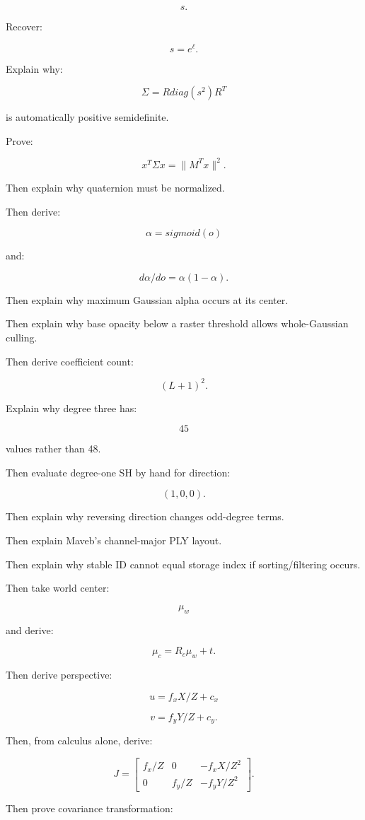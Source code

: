 \[
s.
\]

Recover:

\[
s=e^\ell.
\]

Explain why:

\[
\Sigma
=
Rdiag(s^2)R^T
\]

is automatically positive semidefinite.

Prove:

\[
x^T\Sigma x
=
\|M^Tx\|^2.
\]

Then explain why quaternion must be normalized.

Then derive:

\[
\alpha=sigmoid(o)
\]

and:

\[
d\alpha/do
=
\alpha(1-\alpha).
\]

Then explain why maximum Gaussian alpha occurs at its center.

Then explain why base opacity below a raster threshold allows whole-Gaussian culling.

Then derive coefficient count:

\[
(L+1)^2.
\]

Explain why degree three has:

\[
45
\]

 values rather than 48.

Then evaluate degree-one SH by hand for direction:

\[
(1,0,0).
\]

Then explain why reversing direction changes odd-degree terms.

Then explain Maveb's channel-major PLY layout.

Then explain why stable ID cannot equal storage index if sorting/filtering occurs.

Then take world center:

\[
\mu_w
\]

and derive:

\[
\mu_c=R_c\mu_w+t.
\]

Then derive perspective:

\[
u=f_xX/Z+c_x
\]

\[
v=f_yY/Z+c_y.
\]

Then, from calculus alone, derive:

\[
J=
\begin{bmatrix}
f_x/Z&0&-f_xX/Z^2\\
0&f_y/Z&-f_yY/Z^2
\end{bmatrix}.
\]

Then prove covariance transformation:

